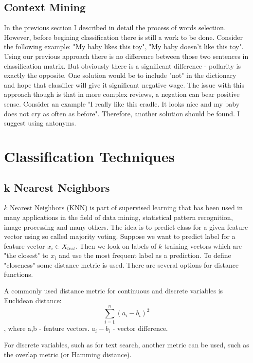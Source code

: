 \documentclass[12pt]{report}
\begin{document}
\newpage

\section{Context Mining}

In the previous section I described in detail the process of words selection. However, before begining classification there is still a work to be done. Consider the following example: "My baby likes this toy", "My baby doesn't like this toy". Using our previous approach there is no difference between those two sentences in classification matrix. But obviously there is a significant difference - pollarity is exactly the opposite. One solution would be to include "not" in the dictionary and hope that classifier will give it significant negative wage. The issue with this approach though is that in more complex reviews, a negation can bear positive sense. Consider an example "I really like this cradle. It looks nice and my baby does not cry as often as before". Therefore, another solution should be found. I suggest using antonyms.

\newpage

\chapter{Classification Techniques}

\section{k Nearest Neighbors}

$k$ Nearest Neighbors (KNN) is part of supervised learning that has been used in many applications in the field of data mining, statistical pattern recognition, image processing and many others. The idea is to predict class for a given feature vector using so called majority voting. Suppose we want to predict label for a feature vector $x_i \in X_{test}$. Then we look on labels of $k$ training vectors which are "the closest" to $x_i$ and use the most frequent label as a prediction. To define "closeness" some distance metric is used. There are several options for distance functions.

A commonly used distance metric for continuous and discrete variables is Euclidean distance:
$$ \sum_{i=1}^{n} (a_i - b_i)^2$$, where a,b - feature vectors. $a_i - b_i$ - vector difference.

For discrete variables, such as for text search, another metric can be used, such as the overlap metric (or Hamming distance).
\end{document}
